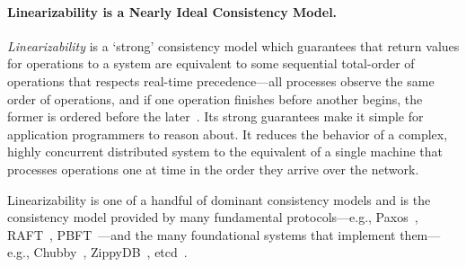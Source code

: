 
\paragraph{Linearizability is a Nearly Ideal Consistency Model.}
\textit{Linearizability} is a `strong' consistency model which guarantees that return values for operations to a system are equivalent to some sequential total-order of operations that respects real-time precedence---all processes observe the same order of operations, and if one operation finishes before another begins, the former is ordered before the later~\cite{herlihy1987linearizability, herlihy1990linearizability}.
Its strong guarantees make it simple for application programmers to reason about. It reduces the behavior of a complex, highly concurrent distributed system to the equivalent of a single machine that processes operations one at time in the order they arrive over the network.

Linearizability is one of a handful of dominant consistency models and is the consistency model provided by many fundamental protocols---e.g., Paxos~\cite{lamport1998paxos}, RAFT~\cite{ongaro2014raft}, PBFT~\cite{castro1999pbft}---and the many foundational systems that implement them---e.g., Chubby~\cite{burrows2006chubby}, ZippyDB~\cite{zippyblog}, etcd~\cite{etcd}.

